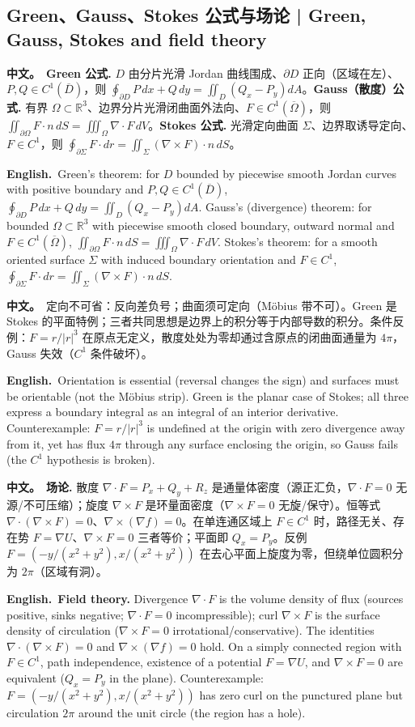 \documentclass[UTF8,11pt,a4paper]{ctexart}
\newcommand{\R}{\mathbb{R}}
\newcommand{\BOTH}[2]{\par\noindent\textbf{中文。}\ #1\par\noindent\textbf{English.}\ #2\par}
\begin{document}
\subsection{Green、Gauss、Stokes 公式与场论 | Green, Gauss, Stokes and field theory}
\BOTH{\textbf{Green 公式.} $D$ 由分片光滑 Jordan 曲线围成、$\partial D$ 正向（区域在左）、$P,Q\in C^1(\overline D)$，则 $\oint_{\partial D}P\,dx+Q\,dy=\iint_D(Q_x-P_y)dA$。\textbf{Gauss（散度）公式.} 有界 $\Omega\subset\R^3$、边界分片光滑闭曲面外法向、$F\in C^1(\overline\Omega)$，则 $\iint_{\partial\Omega}F\cdot n\,dS=\iiint_\Omega\nabla\cdot F\,dV$。\textbf{Stokes 公式.} 光滑定向曲面 $\Sigma$、边界取诱导定向、$F\in C^1$，则 $\oint_{\partial\Sigma}F\cdot dr=\iint_\Sigma(\nabla\times F)\cdot n\,dS$。}{Green's theorem: for $D$ bounded by piecewise smooth Jordan curves with positive boundary and $P,Q\in C^1(\overline D)$, $\oint_{\partial D}P\,dx+Q\,dy=\iint_D(Q_x-P_y)dA$. Gauss's (divergence) theorem: for bounded $\Omega\subset\R^3$ with piecewise smooth closed boundary, outward normal and $F\in C^1(\overline\Omega)$, $\iint_{\partial\Omega}F\cdot n\,dS=\iiint_\Omega\nabla\cdot F\,dV$. Stokes's theorem: for a smooth oriented surface $\Sigma$ with induced boundary orientation and $F\in C^1$, $\oint_{\partial\Sigma}F\cdot dr=\iint_\Sigma(\nabla\times F)\cdot n\,dS$.}
\BOTH{定向不可省：反向差负号；曲面须可定向（Möbius 带不可）。Green 是 Stokes 的平面特例；三者共同思想是边界上的积分等于内部导数的积分。条件反例：$F=r/|r|^3$ 在原点无定义，散度处处为零却通过含原点的闭曲面通量为 $4\pi$，Gauss 失效（$C^1$ 条件破坏）。}{Orientation is essential (reversal changes the sign) and surfaces must be orientable (not the Möbius strip). Green is the planar case of Stokes; all three express a boundary integral as an integral of an interior derivative. Counterexample: $F=r/|r|^3$ is undefined at the origin with zero divergence away from it, yet has flux $4\pi$ through any surface enclosing the origin, so Gauss fails (the $C^1$ hypothesis is broken).}
\BOTH{\textbf{场论.} 散度 $\nabla\cdot F=P_x+Q_y+R_z$ 是通量体密度（源正汇负，$\nabla\cdot F=0$ 无源/不可压缩）；旋度 $\nabla\times F$ 是环量面密度（$\nabla\times F=0$ 无旋/保守）。恒等式 $\nabla\cdot(\nabla\times F)=0$、$\nabla\times(\nabla f)=0$。在单连通区域上 $F\in C^1$ 时，路径无关、存在势 $F=\nabla U$、$\nabla\times F=0$ 三者等价；平面即 $Q_x=P_y$。反例 $F=(-y/(x^2+y^2),x/(x^2+y^2))$ 在去心平面上旋度为零，但绕单位圆积分为 $2\pi$（区域有洞）。}{\textbf{Field theory.} Divergence $\nabla\cdot F$ is the volume density of flux (sources positive, sinks negative; $\nabla\cdot F=0$ incompressible); curl $\nabla\times F$ is the surface density of circulation ($\nabla\times F=0$ irrotational/conservative). The identities $\nabla\cdot(\nabla\times F)=0$ and $\nabla\times(\nabla f)=0$ hold. On a simply connected region with $F\in C^1$, path independence, existence of a potential $F=\nabla U$, and $\nabla\times F=0$ are equivalent ($Q_x=P_y$ in the plane). Counterexample: $F=(-y/(x^2+y^2),x/(x^2+y^2))$ has zero curl on the punctured plane but circulation $2\pi$ around the unit circle (the region has a hole).}
\end{document}
